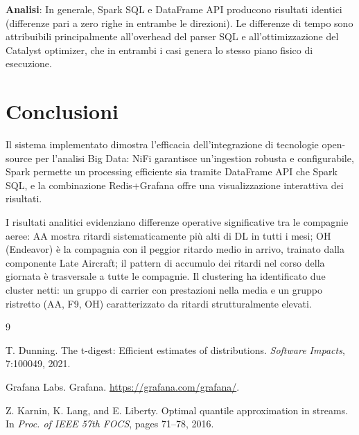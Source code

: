 \documentclass[sigconf]{acmart}
\begin{document}

\textbf{Analisi}: %
In generale, Spark SQL e DataFrame API producono risultati identici (differenze
pari a zero righe in entrambe le direzioni). Le differenze di tempo sono
attribuibili principalmente all'overhead del parser SQL e all'ottimizzazione
del Catalyst optimizer, che in entrambi i casi genera lo stesso piano fisico
di esecuzione.

\section{Conclusioni}

Il sistema implementato dimostra l'efficacia dell'integrazione di tecnologie
open-source per l'analisi Big Data: NiFi garantisce un'ingestion robusta e
configurabile, Spark permette un processing efficiente sia tramite DataFrame
API che Spark SQL, e la combinazione Redis+Grafana offre una visualizzazione
interattiva dei risultati.

I risultati analitici evidenziano differenze operative significative tra le
compagnie aeree: AA mostra ritardi sistematicamente più alti di DL in tutti i
mesi; OH (Endeavor) è la compagnia con il peggior ritardo medio in arrivo,
trainato dalla componente Late Aircraft; il pattern di accumulo dei ritardi nel
corso della giornata è trasversale a tutte le compagnie. Il clustering ha
identificato due cluster netti: un gruppo di carrier con prestazioni nella
media e un gruppo ristretto (AA, F9, OH) caratterizzato da ritardi
strutturalmente elevati.


\begin{thebibliography}{9}

T. Dunning.
\newblock The t-digest: Efficient estimates of distributions.
\newblock \emph{Software Impacts}, 7:100049, 2021.

Grafana Labs.
\newblock Grafana.
\newblock \url{https://grafana.com/grafana/}.

Z. Karnin, K. Lang, and E. Liberty.
\newblock Optimal quantile approximation in streams.
\newblock In \emph{Proc. of IEEE 57th FOCS}, pages 71--78, 2016.

\end{thebibliography}
\end{document}
